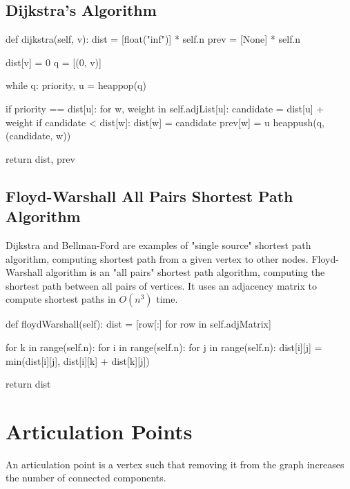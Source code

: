 \subsection{Dijkstra's Algorithm}

\begin{python}
    def dijkstra(self, v):
        dist = [float("inf")] * self.n
        prev = [None] * self.n

        dist[v] = 0
        q = [(0, v)]

        while q:
            priority, u = heappop(q)

            if priority == dist[u]:
                for w, weight in self.adjList[u]:
                    candidate = dist[u] + weight
                    if candidate < dist[w]:
                        dist[w] = candidate
                        prev[w] = u
                        heappush(q, (candidate, w))

        return dist, prev
\end{python}

\subsection{Floyd-Warshall All Pairs Shortest Path Algorithm}

Dijkstra and Bellman-Ford are examples of "single source" shortest path algorithm, computing shortest path from a given vertex to other nodes.
Floyd-Warshall algorithm is an "all pairs" shortest path algorithm, computing the shortest path between all pairs of vertices.
It uses an adjacency matrix to compute shortest paths in $O(n^3)$ time.

\begin{python}
    def floydWarshall(self):
        dist = [row[:] for row in self.adjMatrix]

        for k in range(self.n):
            for i in range(self.n):
                for j in range(self.n):
                    dist[i][j] = min(dist[i][j], dist[i][k] + dist[k][j])

        return dist
\end{python}

\section{Articulation Points}

An articulation point is a vertex such that removing it from the graph increases the number of connected components.

